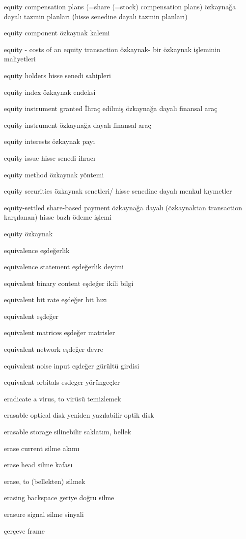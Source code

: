 \documentclass[12pt,fleqn]{article}\usepackage{../../common}
\begin{document}
equity compensation plans (=share (=stock) compensation plans) özkaynağa dayalı tazmin planları (hisse senedine dayalı tazmin planları)

equity component özkaynak kalemi

equity - costs of an equity transaction özkaynak- bir özkaynak işleminin maliyetleri

equity holders hisse senedi sahipleri

equity index özkaynak endeksi

equity instrument granted İhraç edilmiş özkaynağa dayalı finansal araç

equity instrument özkaynağa dayalı finansal araç

equity interests özkaynak payı

equity issue hisse senedi ihracı

equity method özkaynak yöntemi

equity securities özkaynak senetleri/ hisse senedine dayalı menkul kıymetler

equity-settled share-based payment özkaynağa dayalı (özkaynaktan transaction karşılanan) hisse bazlı ödeme işlemi

equity özkaynak

equivalence eşdeğerlik

equivalence statement eşdeğerlik deyimi

equivalent binary content eşdeğer ikili bilgi

equivalent bit rate eşdeğer bit hızı

equivalent eşdeğer

equivalent matrices eşdeğer matrisler

equivalent network eşdeğer devre

equivalent noise input eşdeğer gürültü girdisi

equivalent orbitals esdeger yörüngeçler

eradicate a virus, to virüsü temizlemek

erasable optical disk yeniden yazılabilir optik disk

erasable storage silinebilir saklatım, bellek

erase current silme akımı

erase head silme kafası

erase, to (bellekten) silmek

erasing backspace geriye doğru silme

erasure signal silme sinyali

çerçeve frame
\end{document}
